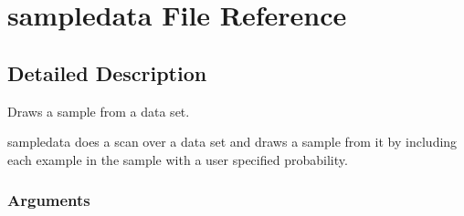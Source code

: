 \section{sampledata File Reference}
\label{sampledata}


\subsection{Detailed Description}
Draws a sample from a data set. 

sampledata does a scan over a data set and draws a sample from it by including each example in the sample with a user specified probability.

\subsubsection*{Arguments}

